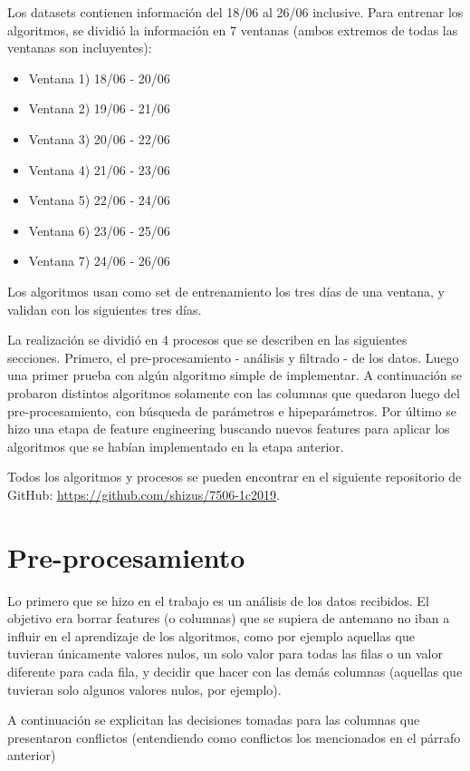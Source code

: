 \documentclass{article}
\begin{document}
Los datasets contienen información del 18/06 al 26/06 inclusive.
Para entrenar los algoritmos, se dividió la información en 7 ventanas (ambos extremos de todas las ventanas son incluyentes):

\begin{itemize}
    \item Ventana 1) 18/06 - 20/06 \item Ventana 2) 19/06 - 21/06
    \item Ventana 3) 20/06 - 22/06 \item Ventana 4) 21/06 - 23/06
    \item Ventana 5) 22/06 - 24/06 \item Ventana 6) 23/06 - 25/06
    \item Ventana 7) 24/06 - 26/06
\end{itemize}

Los algoritmos usan como set de entrenamiento los tres días de una ventana, y validan con los siguientes tres días.

La realización se dividió en 4 procesos que se describen en las siguientes secciones.
Primero, el pre-procesamiento - análisis y filtrado - de los datos. Luego una primer prueba con algún algoritmo simple de implementar. A continuación se probaron distintos algoritmos solamente con las columnas que quedaron luego del pre-procesamiento, con búsqueda de parámetros e hipeparámetros. Por último se hizo una etapa de feature engineering buscando nuevos features para aplicar los algoritmos que se habían implementado en la etapa anterior.

Todos los algoritmos y procesos se pueden encontrar en el siguiente repositorio de GitHub: \href{https://github.com/shizus/7506-1c2019}{https://github.com/shizus/7506-1c2019}.

\newpage
\section{Pre-procesamiento}
Lo primero que se hizo en el trabajo es un análisis de los datos recibidos. El objetivo era borrar features (o columnas) que se supiera de antemano no iban a influir en el aprendizaje de los algoritmos, como por ejemplo aquellas que tuvieran únicamente valores nulos, un solo valor para todas las filas o un valor diferente para cada fila, y decidir que hacer con las demás columnas (aquellas que tuvieran solo algunos valores nulos, por ejemplo).

A continuación se explicitan las decisiones tomadas para las columnas que presentaron conflictos (entendiendo como conflictos los mencionados en el párrafo anterior)
\end{document}
